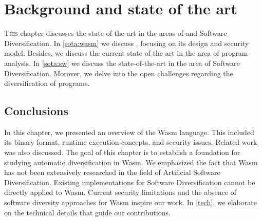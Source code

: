 \chapter{Background and state of the art}
\label{SOTA}

\lettrine[lines=4]{T}{his} chapter discusses the state-of-the-art in the areas of \Wasm and Software Diversification. 
In \autoref{sota:wasm} we discuss \Wasm, focusing on its design and security model.
Besides, we discuss the current state of the art in the area of \Wasm program analysis.
In \autoref{sota:sw} we discuss the state-of-the-art in the area of Software Diversification.
Morover, we delve into the open challenges regarding the diversification of \Wasm programs.






\section*{Conclusions}

In this chapter, we presented an overview of the Wasm language. 
This included its binary format, runtime execution concepts, and security issues. 
Related work was also discussed. 
The goal of this chapter is to establish a foundation for studying automatic diversification in Wasm. 
We emphasized the fact that Wasm has not been extensively researched in the field of Artificial Software Diversification. 
Existing implementations for Software Diversification cannot be directly applied to Wasm. 
Current security limitations and the absence of software diversity approaches for Wasm inspire our work. 
In \autoref{tech}, we elaborate on the technical details that guide our contributions.

